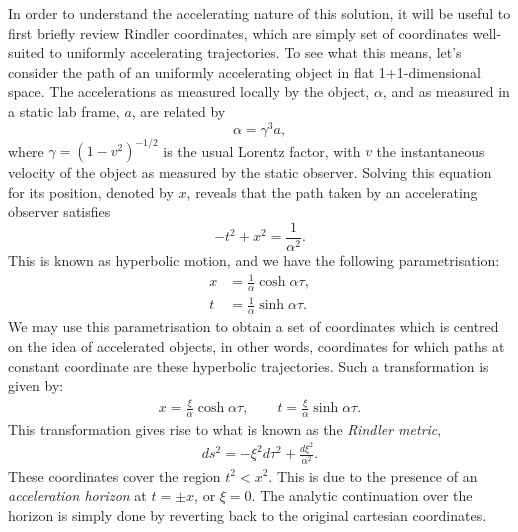 \documentclass[
twoside,
openright,
frontopenright
]{dmathesis}
\newcommand{\nn}{\nonumber}
\begin{document}
In order to understand the accelerating nature of this solution, it will be
useful to first briefly review Rindler coordinates, which are simply set of
coordinates well-suited to uniformly accelerating trajectories. To see what this
means, let's consider the path of an uniformly accelerating object in flat
1+1-dimensional space. The accelerations as measured locally by the object,
$\alpha$, and as measured in a static lab frame, $a$, are related by
\begin{equation}
  \alpha = \gamma^3a,
\end{equation}
where $\gamma = (1-v^2)^{-1/2}$ is the usual Lorentz factor, with $v$ the
instantaneous velocity of the object as measured by the static observer. Solving
this equation for its position, denoted by $x$, reveals that the path taken by
an accelerating observer satisfies
\begin{equation}
  -t^2+x^2=\frac{1}{\alpha^2}.
\end{equation}
This is known as hyperbolic motion, and we have the following parametrisation:
\begin{align}
  \label{eq:trajectory}
  x &= \frac{1}{\alpha} \cosh \alpha \tau,\nn\\
  t &= \frac{1}{\alpha} \sinh \alpha \tau.
\end{align}
We may use this parametrisation to obtain a set of coordinates which is centred
on the idea of accelerated objects, in other words, coordinates for which paths
at constant coordinate are these hyperbolic trajectories. Such a transformation
is given by:
\begin{align}
  x = \frac{\xi}{\alpha} \cosh \alpha \tau,\qquad t = \frac{\xi}{\alpha} \sinh
  \alpha \tau.
\end{align}
This transformation gives rise to what is known as the \emph{Rindler metric},
\begin{align}
   ds^2 = -\xi^2 d\tau^2 + \frac{d\xi^2}{\alpha^2}.
\end{align}
These coordinates cover the region $t^2<x^2$. This is due to the presence of an
\emph{acceleration horizon} at $t = \pm x$, or $\xi = 0$. The analytic
continuation over the horizon is simply done by reverting back to the original
cartesian coordinates.
\end{document}
